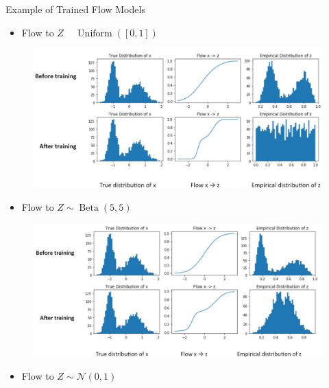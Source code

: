 \begin{frame}[allowframebreaks]

\begin{myexampleblock}{10.10}{Example of Trained Flow Models}
    \begin{itemize}
        \item Flow to $Z$ ~ $\operatorname{Uniform}([0,1])$
    \end{itemize}

    \begin{figure}[H]
        \centering
        \includegraphics[width=1.0\textwidth]{.././assets/10.8.png}
    \end{figure}

    \begin{itemize}
        \item Flow to $Z \sim \operatorname{Beta}(5,5)$
    \end{itemize}

    \begin{figure}[H]
        \centering
        \includegraphics[width=1.0\textwidth]{.././assets/10.9.png}
    \end{figure}

    \begin{itemize}
        \item Flow to $Z \sim \mathcal{N}(0,1)$
    \end{itemize}


\end{myexampleblock}
\end{frame}

